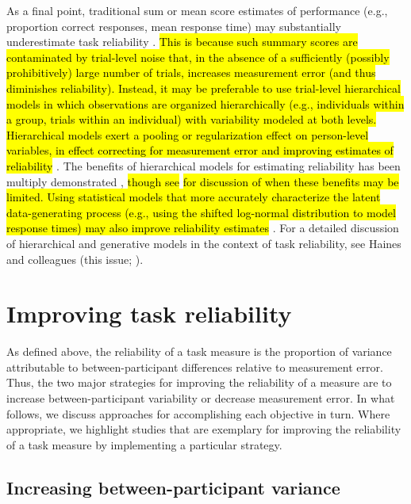 \documentclass[a4paper,12pt]{article}
\begin{document}
As a final point, traditional sum or mean score estimates of performance (e.g., proportion correct responses, mean response time) may substantially underestimate task reliability \cite{Rouder2019-am, haines2020learning, chen2021trial}. \hl{This is because such summary scores are contaminated by trial-level noise that, in the absence of a sufficiently (possibly prohibitively) large number of trials, increases measurement error (and thus diminishes reliability). Instead, it may be preferable to use trial-level hierarchical models in which observations are organized hierarchically (e.g., individuals within a group, trials within an individual) with variability modeled at both levels. Hierarchical models exert a pooling or regularization effect on person-level variables, in effect correcting for measurement error and improving estimates of reliability} \cite{Rouder2019-am, haines2020learning, chen2021trial}. The benefits of hierarchical models for estimating reliability has been multiply demonstrated \cite{snijder2022psychometric, sullivan2022enhancing, brown2020improving, waltmann2022sufficient}, \hl{though see} \cite{rouder2019most} \hl{for discussion of when these benefits may be limited. Using statistical models that more accurately characterize the latent data-generating process (e.g., using the shifted log-normal distribution to model response times) may also improve reliability estimates} \cite{haines2020learning, price2019computational}. For a detailed discussion of hierarchical and generative models in the context of task reliability, see Haines and colleagues (this issue; \cite{haines2020learning}).

\section{Improving task reliability}

As defined above, the reliability of a task measure is the proportion of variance attributable to between-participant differences relative to measurement error. Thus, the two major strategies for improving the reliability of a measure are to increase between-participant variability or decrease measurement error. In what follows, we discuss approaches for accomplishing each objective in turn. Where appropriate, we highlight studies that are exemplary for improving the reliability of a task measure by implementing a particular strategy. 

\subsection{Increasing between-participant variance}
\end{document}

